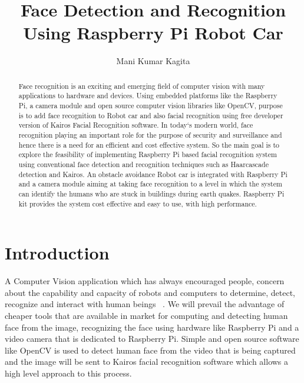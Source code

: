 \documentclass[sigconf]{acmart}
\begin{document}
\title{Face Detection and Recognition Using Raspberry Pi Robot Car}

\author{Mani Kumar Kagita}


\begin{abstract}
Face recognition is an exciting and emerging field of computer vision with many  applications to hardware and devices. Using embedded platforms like the Raspberry Pi, a camera module and open source computer vision libraries like OpenCV, purpose is to add face recognition to Robot car and also facial recognition using free developer version of Kairos Facial Recognition software.
In today`s modern world, face recognition playing an important role for the purpose of security and surveillance and hence there is a need for an efficient and cost effective system. So the main goal is to explore the feasibility of implementing Raspberry Pi based facial recognition system using conventional face detection and recognition techniques such as Haarcascade detection and Kairos. An obstacle avoidance Robot car is integrated with Raspberry Pi and a camera module aiming at taking face recognition to a level in which the system can identify the humans who are stuck in buildings during earth quakes.  Raspberry Pi kit provides the system cost effective and easy to use, with high performance.

\end{abstract}


\maketitle

\section{Introduction}
A Computer Vision application which has always encouraged people, concern about the capability and capacity of  robots and computers to determine, detect, recognize and interact with human beings ~\cite{Boris2014}. We will prevail the advantage of cheaper tools that are available in market for computing and detecting human face from the image, recognizing the face using hardware like Raspberry Pi and a video camera that is dedicated to Raspberry Pi. Simple and open source software like OpenCV is used to detect human face from the video that is being captured and the image will be sent to Kairos facial recognition software which allows a high level approach to this process.
\end{document}
